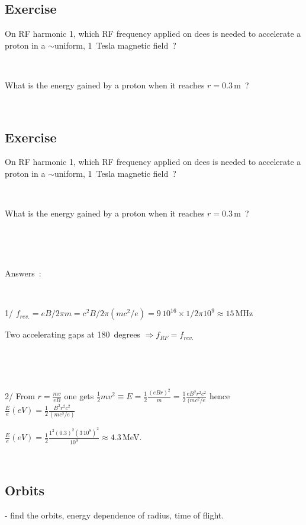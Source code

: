 \subsection*{Exercise}


{
On RF harmonic 1, which RF frequency applied on dees 
is needed to accelerate a proton in a $\sim$uniform, 1~Tesla magnetic field~? 

~

What is the  energy gained by a proton when it reaches $r=0.3\,$m~?
}

~



\subsection*{Exercise}


{
On RF harmonic 1, which RF frequency applied on dees 
is needed to accelerate a proton in a $\sim$uniform, 1~Tesla magnetic field~? 

~

What is the  energy gained by a proton when it reaches $r=0.3\,$m~?
}


~

~

{
Answers~:  

~

1/ $f_{rev.} = e B / 2 \pi m = c^2 B / 2 \pi (mc^2/e) = 9\, 10^{16} \times 1 / 2 \pi 10^9 \approx 15\,$MHz

Two accelerating gaps  at 180~degrees $\Rightarrow  f_{RF} = f_{rev.}$ 

~

~

2/
From $r =\frac{mv}{eB}$ one gets $\frac{1}{2} m v^2 \equiv E  = \frac{1}{2} \frac{(eBr)^2}{m}  = 
\frac{1}{2} \frac{eB^2r^2c^2}{(mc^2/e}  $ hence $\frac{E}{e} (eV) = \frac{1}{2} \frac{B^2r^2c^2}{(mc^2/e)}  $ 

$\frac{E}{e} (eV) = \frac{1}{2} \frac{1^2 (0.3)^2 (3\, 10^8)^2}{10^9} \approx 4.3\, $MeV.  



~
}






\subsection{Orbits}

- find the orbits, energy dependence of radius, time of flight.

